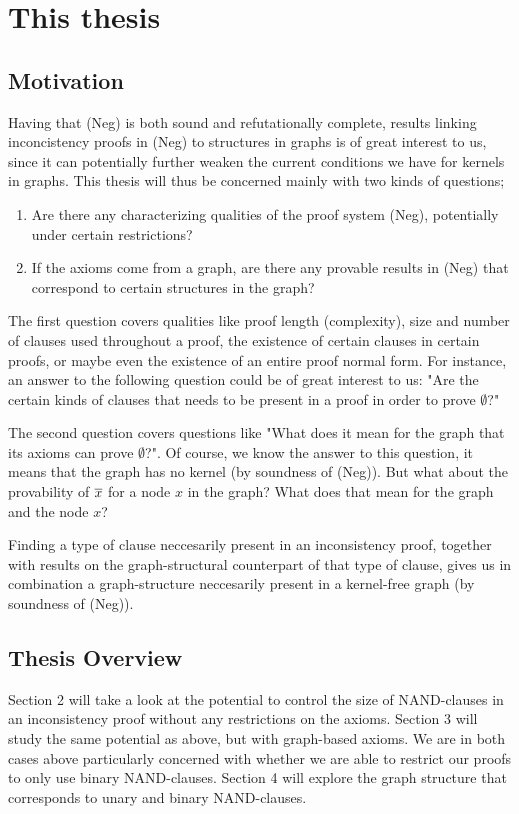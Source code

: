 \section{This thesis}
\label{sec:This thesis}
\subsection{Motivation}
\label{sub:Motivation}
Having that (Neg) is both sound and refutationally complete, results linking inconcistency proofs in (Neg) to structures in graphs is of great interest to us, since it can potentially further weaken the current conditions we have for kernels in graphs.
This thesis will thus be concerned mainly with two kinds of questions;
\begin{enumerate}
  \item Are there any characterizing qualities of the proof system (Neg), potentially under certain restrictions?
  \item If the axioms come from a graph, are there any provable results in (Neg) that correspond to certain structures in the graph?
\end{enumerate}
The first question covers qualities like proof length (complexity), size and number of clauses used throughout a proof, the existence of certain clauses in certain proofs, or maybe even the existence of an entire proof normal form.
For instance, an answer to the following question could be of great interest to us: "Are the certain kinds of clauses that needs to be present in a proof in order to prove $\emptyset$?"

The second question covers questions like "What does it mean for the graph that its axioms can prove $\emptyset$?".
Of course, we know the answer to this question, it means that the graph has no kernel (by soundness of (Neg)).
But what about the provability of $\overline{x}$ for a node $x$ in the graph?
What does that mean for the graph and the node $x$?

Finding a type of clause neccesarily present in an inconsistency proof, together with results on the graph-structural counterpart of that type of clause, gives us in combination a graph-structure neccesarily present in a kernel-free graph (by soundness of (Neg)).
\subsection{Thesis Overview}
\label{sub:Thesis Overview}
Section 2 will take a look at the potential to control the size of NAND-clauses in an inconsistency proof without any restrictions on the axioms.
Section 3 will study the same potential as above, but with graph-based axioms.
We are in both cases above particularly concerned with whether we are able to restrict our proofs to only use binary NAND-clauses.
Section 4 will explore the graph structure that corresponds to unary and binary NAND-clauses.
